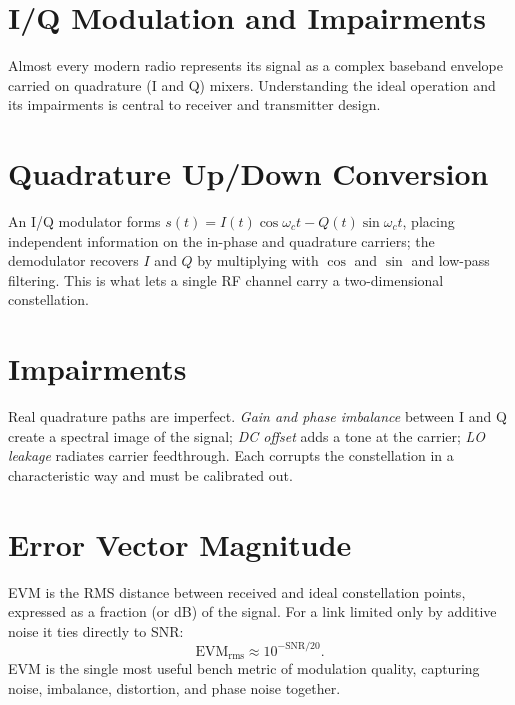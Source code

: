 \section{I/Q Modulation and Impairments}\label{sec:tb_iq}



Almost every modern radio represents its signal as a complex baseband envelope
carried on quadrature (I and Q) mixers. Understanding the ideal operation and its
impairments is central to receiver and transmitter design.

\section{Quadrature Up/Down Conversion}
An I/Q modulator forms $s(t) = I(t)\cos\omega_c t - Q(t)\sin\omega_c t$, placing
independent information on the in-phase and quadrature carriers; the demodulator
recovers $I$ and $Q$ by multiplying with $\cos$ and $\sin$ and low-pass
filtering. This is what lets a single RF channel carry a two-dimensional
constellation.

\section{Impairments}
Real quadrature paths are imperfect. \emph{Gain and phase imbalance} between I and
Q create a spectral image of the signal; \emph{DC offset} adds a tone at the
carrier; \emph{LO leakage} radiates carrier feedthrough. Each corrupts the
constellation in a characteristic way and must be calibrated out.

\section{Error Vector Magnitude}
EVM is the RMS distance between received and ideal constellation points, expressed
as a fraction (or dB) of the signal. For a link limited only by additive noise it
ties directly to SNR:
\[ \text{EVM}_{\text{rms}} \approx 10^{-\text{SNR}/20}. \]
EVM is the single most useful bench metric of modulation quality, capturing noise,
imbalance, distortion, and phase noise together.



